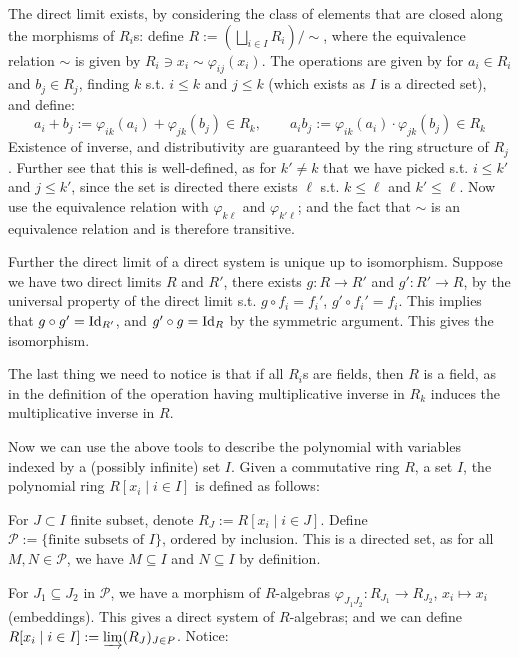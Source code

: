 \documentclass{article}
\begin{document}
\begin{parenthesis}
    The direct limit exists, by considering the class of elements that are closed along the morphisms of $R_i$s: define $R := \left(\bigsqcup_{i \in I} R_i\right)/\sim$, where the equivalence relation $\sim$ is given by $R_i \ni x_i \sim \varphi_{ij}(x_i)$. The operations are given by for $a_i \in R_i$ and $b_j \in R_j$, finding $k$ s.t. $i \leq k$ and $j \leq k$ (which exists as $I$ is a directed set), and define:
    \[
        a_i + b_j := \varphi_{ik}(a_i) + \varphi_{jk}(b_j) \in R_k, \qquad
        a_i b_j := \varphi_{ik}(a_i) \cdot \varphi_{jk}(b_j) \in R_k
    \]
    Existence of inverse, and distributivity are guaranteed by the ring structure of $R_j$. Further see that this is well-defined, as for $k' \neq k$ that we have picked s.t. $i \leq k'$ and $j \leq k'$, since the set is directed there exists $\ell$ s.t. $k \leq \ell$ and $k' \leq \ell$. Now use the equivalence relation with $\varphi_{k\ell}$ and $\varphi_{k'\ell}$; and the fact that $\sim$ is an equivalence relation and is therefore transitive. 

    Further the direct limit of a direct system is unique up to isomorphism. Suppose we have two direct limits $R$ and $R'$, there exists $g: R \to R'$ and $g': R' \to R$, by the universal property of the direct limit s.t. $g \circ f_i = f_i'$, $g' \circ f_i' = f_i$. This implies that $g \circ g' = \mathrm{Id}_{R'}$, and $g' \circ g = \mathrm{Id}_{R}$ by the symmetric argument. This gives the isomorphism.

    The last thing we need to notice is that if all $R_i$s are fields, then $R$ is a field, as in the definition of the operation having multiplicative inverse in $R_k$ induces the multiplicative inverse in $R$.
\end{parenthesis}

Now we can use the above tools to describe the polynomial with variables indexed by a (possibly infinite) set $I$. Given a commutative ring $R$, a set $I$, the polynomial ring $R[x_i \mid i \in I]$ is defined as follows:

For $J \subset I$ finite subset, denote $R_J := R[x_i \mid i \in J]$. Define $\mathcal{P} := \{\text{finite subsets of $I$}\}$, ordered by inclusion. This is a directed set, as for all $M, N \in \mathcal{P}$, we have $M \subseteq I$ and $N \subseteq I$ by definition.

For $J_1 \subseteq J_2$ in $\mathcal{P}$, we have a morphism of $R$-algebras $\varphi_{J_1 J_2}: R_{J_1} \to R_{J_2}$, $x_i \mapsto x_i$ (embeddings). This gives a direct system of $R$-algebras; and we can define $R[x_i \mid i \in I] := \varinjlim (R_J)_{J \in P}$. Notice:
\end{document}
